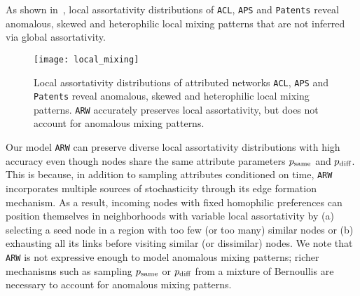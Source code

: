 As shown in~, local assortativity distributions
of \texttt{ACL}, \texttt{APS} and \texttt{Patents} reveal anomalous, skewed
and heterophilic local mixing patterns that are not inferred via global assortativity.
\begin{figure}
	\centering
	\texttt{[image: local\_mixing]}
	\caption{Local assortativity distributions of attributed networks \texttt{ACL}, \texttt{APS}
		and \texttt{Patents} reveal anomalous, skewed and heterophilic local mixing patterns.
		\texttt{ARW} accurately preserves local assortativity, but does not account for anomalous mixing patterns.}
	\label{fig:local_atty}
	\vspace{-8pt}
\end{figure}
Our model \texttt{ARW} can preserve
diverse local assortativity distributions with high accuracy even though nodes
share the same attribute parameters $p_{\scriptsize\mbox{same}}$ and $p_{\scriptsize\mbox{diff}}$. This is because, in addition
to sampling attributes conditioned on time, \texttt{ARW}
incorporates multiple sources of stochasticity through its edge formation
mechanism. As a result, incoming nodes with fixed homophilic preferences can position
themselves in neighborhoods with variable local assortativity by (a) selecting a seed node in a region
with too few (or too many) similar nodes or (b) exhausting all its links before
visiting similar (or dissimilar) nodes.
We note that \texttt{ARW} is not expressive enough to model anomalous
mixing patterns; richer mechanisms such as sampling $p_{\scriptsize\mbox{same}}$ or $p_{\scriptsize\mbox{diff}}$
from a mixture of Bernoullis are necessary to account for anomalous mixing patterns.
